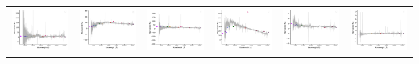 \begin{center}
\begin{longtable}{l l l l l l }
    \includegraphics[width=0.3\linewidth, clip]{Figs/Figs-lamost/spec-56012-F5601204_sp13-173-SPLUS-n01s22-036940.pdf} & \includegraphics[width=0.3\linewidth, clip]{Figs/Figs-lamost/spec-56591-EG012606S021203F01_sp16-150-STRIPE82-0031-049213.pdf} & \includegraphics[width=0.3\linewidth, clip]{Figs/Figs-lamost/spec-56741-HD115451S012705B_sp12-016-SPLUS-n01s23-026372.pdf} & \includegraphics[width=0.3\linewidth, clip]{Figs/Figs-lamost/spec-56948-EG212551N003203M01_sp10-202-STRIPE82-0115-048674.pdf} & \includegraphics[width=0.3\linewidth, clip]{Figs/Figs-lamost/spec-57304-EG230517N011825M01_sp02-068-STRIPE82-0151-054324.pdf} & \includegraphics[width=0.3\linewidth, clip]{Figs/Figs-lamost/spec-57330-EG220307N031056M01_sp07-205-STRIPE82-0132-050056.pdf} \\

\end{longtable}
\end{center}

